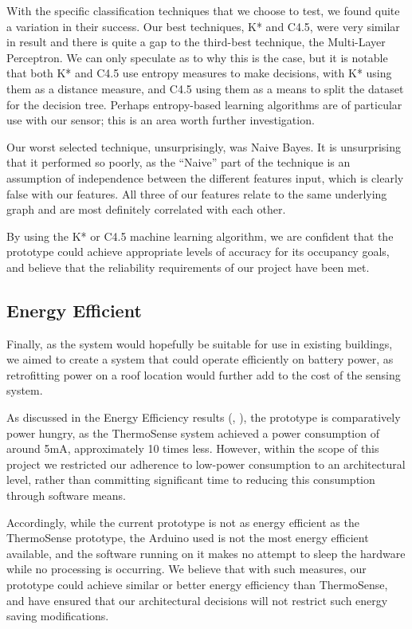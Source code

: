 \documentclass[../thesis/thesis.tex]{subfiles}
\begin{document}
With the specific classification techniques that we choose to test, we found quite a variation in their success. Our best techniques, K* and C4.5, were very similar in result and there is quite a gap to the third-best technique, the Multi-Layer Perceptron. We can only speculate as to why this is the case, but it is notable that both K* and C4.5 use entropy measures to make decisions, with K* using them as a distance measure, and C4.5 using them as a means to split the dataset for the decision tree. Perhaps entropy-based learning algorithms are of particular use with our sensor; this is an area worth further investigation.

Our worst selected technique, unsurprisingly, was Naive Bayes. It is unsurprising that it performed so poorly, as the ``Naive'' part of the technique is an assumption of independence between the different features input, which is clearly false with our features. All three of our features relate to the same underlying graph and are most definitely correlated with each other.

By using the K* or C4.5 machine learning algorithm, we are confident that the prototype could achieve appropriate levels of accuracy for its occupancy goals, and believe that the reliability requirements of our project have been met.

\subsection{Energy Efficient}
Finally, as the system would hopefully be suitable for use in existing buildings, we aimed to create a system that could operate efficiently on battery power, as retrofitting power on a roof location would further add to the cost of the sensing system.

As discussed in the Energy Efficiency results (, ), the prototype is comparatively power hungry, as the ThermoSense system achieved a power consumption of around 5mA, approximately 10 times less. However, within the scope of this project we restricted our adherence to low-power consumption to an architectural level, rather than committing significant time to reducing this consumption through software means.

Accordingly, while the current prototype is not as energy efficient as the ThermoSense prototype, the Arduino used is not the most energy efficient available, and the software running on it makes no attempt to sleep the hardware while no processing is occurring. We believe that with such measures, our prototype could achieve similar or better energy efficiency than ThermoSense, and have ensured that our architectural decisions will not restrict such energy saving modifications.
\end{document}
